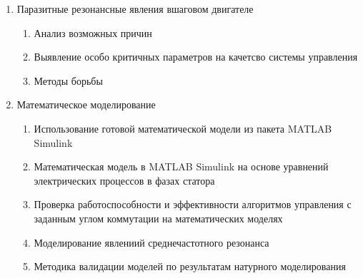 \begin{enumerate}
    \item{Паразитные резонансные явления вшаговом двигателе}
        \begin{enumerate}
            \item Анализ возможных причин
            \item Выявление особо критичных параметров на качетсво системы управления
            \item Методы борьбы
        \end{enumerate}

    \item{Математическое моделирование}
        \begin{enumerate}
            \item Использование готовой математической модели из пакета MATLAB Simulink
            \item Математическая модель в MATLAB Simulink на основе уравнений электрических
                    процессов в фазах статора
            \item Проверка работоспособности и эффективности алгоритмов управления с заданным углом
                    коммутации на математических моделях
            \item Моделирование явлениий среднечастотного резонанса
            \item Методика валидации моделей по результатам натурного моделирования
        \end{enumerate}
\end{enumerate}

\newpage
